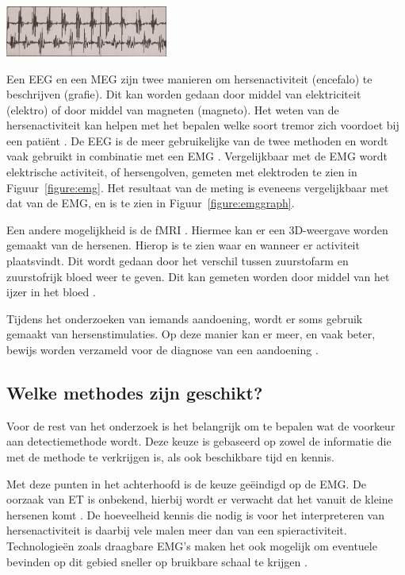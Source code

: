\begin{center}
    \includegraphics[width=0.4\textwidth]{./graphics/graph-emg.png}
    \label{figure:emggraph}
\end{center}

Een EEG en een MEG zijn twee manieren om hersenactiviteit (encefalo) te beschrijven (grafie).
Dit kan worden gedaan door middel van elektriciteit (elektro) of door middel van magneten (magneto).
Het weten van de hersenactiviteit kan helpen met het bepalen welke soort tremor zich voordoet bij een patiënt \cite{knf2022,elsevier2022}.
De EEG is de meer gebruikelijke van de twee methoden en wordt vaak gebruikt in combinatie met een EMG \cite{knf2022}.
Vergelijkbaar met de EMG wordt elektrische activiteit, of hersengolven, gemeten met elektroden te zien in Figuur~\ref{figure:emg}.
Het resultaat van de meting is eveneens vergelijkbaar met dat van de EMG, en is te zien in Figuur~\ref{figure:emggraph}.

Een andere mogelijkheid is de fMRI \cite{elsevier2022}.
Hiermee kan er een 3D-weergave worden gemaakt van de hersenen.
Hierop is te zien waar en wanneer er activiteit plaatsvindt.
Dit wordt gedaan door het verschil tussen zuurstofarm en zuurstofrijk bloed weer te geven.
Dit kan gemeten worden door middel van het ijzer in het bloed \cite{hersenstichting2023}.

Tijdens het onderzoeken van iemands aandoening, wordt er soms gebruik gemaakt van hersenstimulaties.
Op deze manier kan er meer, en vaak beter, bewijs worden verzameld voor de diagnose van een aandoening \cite{elsevier2022}.

\subsection{Welke methodes zijn geschikt?}

Voor de rest van het onderzoek is het belangrijk om te bepalen wat de voorkeur aan detectiemethode wordt.
Deze keuze is gebaseerd op zowel de informatie die met de methode te verkrijgen is, als ook beschikbare tijd en kennis.

Met deze punten in het achterhoofd is de keuze geëindigd op de EMG.
De oorzaak van ET is onbekend, hierbij wordt er verwacht dat het vanuit de kleine hersenen komt \cite{elsevier2022}.
De hoeveelheid kennis die nodig is voor het interpreteren van hersenactiviteit is daarbij vele malen meer dan van een spieractiviteit.
Technologieën zoals draagbare EMG's maken het ook mogelijk om eventuele bevinden op dit gebied sneller op bruikbare schaal te krijgen \cite{frontiers2022}.

